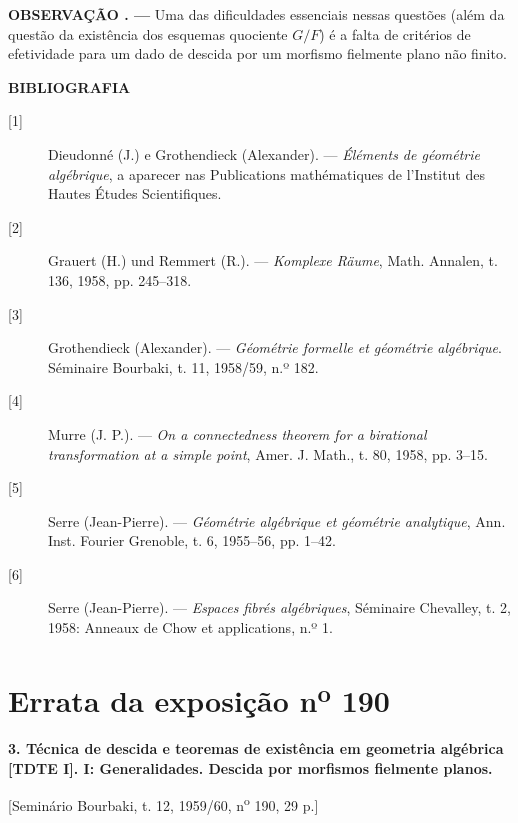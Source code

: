 \documentclass[11pt,twoside,openany]{book}
\numberwithin{equation}{section}
\newcommand{\src}[1]{%
  \phantomsection\hypertarget{src:#1}{}%
  \marginpar{\raggedleft\footnotesize\sffamily #1}%
}
\newcommand{\sid}[1]{\phantomsection\hypertarget{fga:#1}{}}
\theoremstyle{plain}
\theoremstyle{definition}
\theoremstyle{remark}
\newcommand{\result}[2]{%
  \par\medskip\noindent\textbf{#1%
  \if\relax\detokenize{#2}\relax\else\space#2\fi. ---}\enspace
}
\newcommand{\FgaUnitKey}{frontmatter}
\renewcommand{\src}[1]{%
  \phantomsection\hypertarget{src:\FgaUnitKey:#1}{}%
  \marginpar{\raggedleft\footnotesize\sffamily #1}%
}
\begin{document}
\result{OBSERVAÇÃO}{} Uma das dificuldades essenciais nessas questões
(além da questão da existência dos esquemas quociente $G/F$) é a
falta de critérios de efetividade para um dado de descida por um morfismo
fielmente plano não finito.

\src{327}
\begin{center}
  \textbf{BIBLIOGRAFIA}
\end{center}

\begin{description}
  \item[{[1]}] Dieudonné (J.) e Grothendieck (Alexander). --- \emph{Éléments
    de géométrie algébrique}, a aparecer nas Publications
    mathématiques de l'Institut des Hautes Études Scientifiques.
  \item[{[2]}] Grauert (H.) und Remmert (R.). --- \emph{Komplexe Räume}, Math.
    Annalen, t. 136, 1958, pp. 245--318.
  \item[{[3]}] Grothendieck (Alexander). --- \emph{Géométrie formelle et
    géométrie algébrique}. Séminaire Bourbaki, t. 11, 1958/59, n.º 182.
  \item[{[4]}] Murre (J. P.). --- \emph{On a connectedness theorem for a
    birational transformation at a simple point}, Amer. J. Math., t. 80, 1958,
    pp. 3--15.
  \item[{[5]}] Serre (Jean-Pierre). --- \emph{Géométrie algébrique et géométrie
    analytique}, Ann. Inst. Fourier Grenoble, t. 6, 1955--56, pp. 1--42.
  \item[{[6]}] Serre (Jean-Pierre). --- \emph{Espaces fibrés algébriques},
    Séminaire Chevalley, t. 2, 1958: Anneaux de Chow et applications, n.º 1.
\end{description}

\par

\def\FgaUnitKey{e190}\clearpage
\chapter*{Errata da exposição n\textsuperscript{o} 190}
\setcounter{footnote}{0}
\sid{e190}
\src{300}

\noindent\textbf{3. Técnica de descida e teoremas de existência em geometria
algébrica [TDTE I]. I: Generalidades. Descida por morfismos fielmente planos.}

\begin{center}
[Seminário Bourbaki, t. 12, 1959/60, n\textsuperscript{o} 190, 29 p.]
\end{center}
\end{document}
